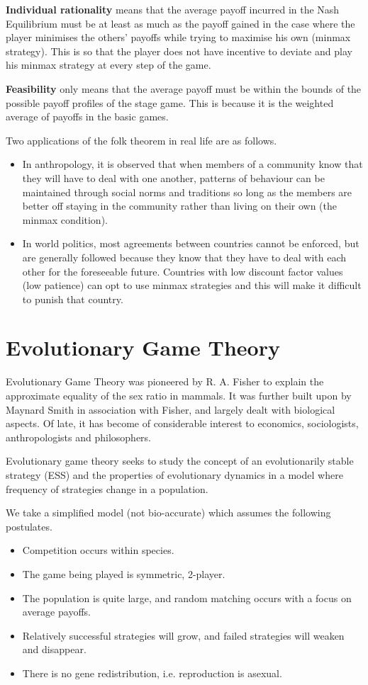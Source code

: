 \documentclass[11pt]{article}
\theoremstyle{definition}
\begin{document}
\textbf{Individual rationality} means that the average payoff incurred in the Nash Equilibrium must be at least as much as the payoff gained in the case where the player minimises the others' payoffs while trying to maximise his own (minmax strategy). This is so that the player does not have incentive to deviate and play his minmax strategy at every step of the game. 

\textbf{Feasibility} only means that the average payoff must be within the bounds of the possible payoff profiles of the stage game. This is because it is the weighted average of payoffs in the basic games.

Two applications of the folk theorem in real life are as follows.
\begin{itemize}
\item In anthropology, it is observed that when members of a community know that they will have to deal with one another, patterns of behaviour can be maintained through social norms and traditions so long as the members are better off staying in the community rather than living on their own (the minmax condition).
\item In world politics, most agreements between countries cannot be enforced, but are generally followed because they know that they have to deal with each other for the foreseeable future. Countries with low discount factor values (low patience) can opt to use minmax strategies and this will make it difficult to punish that country.
\end{itemize}

\section{Evolutionary Game Theory}

Evolutionary Game Theory was pioneered by R. A. Fisher to explain the approximate equality of the sex ratio in mammals. It was further built upon by Maynard Smith in association with Fisher, and largely dealt with biological aspects. Of late, it has become of considerable interest to economics, sociologists, anthropologists and philosophers. 

Evolutionary game theory seeks to study the concept of an evolutionarily stable strategy (ESS) and the properties of evolutionary dynamics in a model where frequency of strategies change in a population.

We take a simplified model (not bio-accurate) which assumes the following postulates.
\begin{itemize}
\itemsep0em
\item Competition occurs within species.
\item The game being played is symmetric, 2-player.
\item The population is quite large, and random matching occurs with a focus on average payoffs.
\item Relatively successful strategies will grow, and failed strategies will weaken and disappear.
\item There is no gene redistribution, i.e. reproduction is asexual.
\end{itemize}
\end{document}
